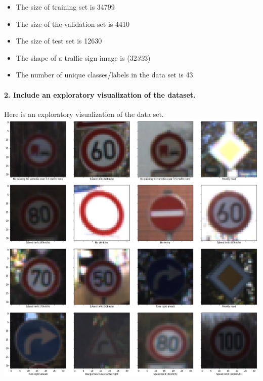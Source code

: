 \documentclass[11pt]{article}
\makeatletter
\def\maxwidth{\ifdim\Gin@nat@width>\linewidth\linewidth
    \else\Gin@nat@width\fi}
\let\Oldincludegraphics\includegraphics
\renewcommand{\includegraphics}[1]{\Oldincludegraphics[width=.8\maxwidth]{#1}}
\providecommand{\tightlist}{%
      \setlength{\itemsep}{0pt}\setlength{\parskip}{0pt}}
\makeatother
\begin{document}
\begin{itemize}
\tightlist
\item
  The size of training set is 34799
\item
  The size of the validation set is 4410
\item
  The size of test set is 12630
\item
  The shape of a traffic sign image is (32\emph{32}3)
\item
  The number of unique classes/labels in the data set is 43
\end{itemize}

\hypertarget{include-an-exploratory-visualization-of-the-dataset.}{%
\paragraph{2. Include an exploratory visualization of the
dataset.}\label{include-an-exploratory-visualization-of-the-dataset.}}

Here is an exploratory visualization of the data set.
\includegraphics{exploratory_visualizaiton.png}
\end{document}

